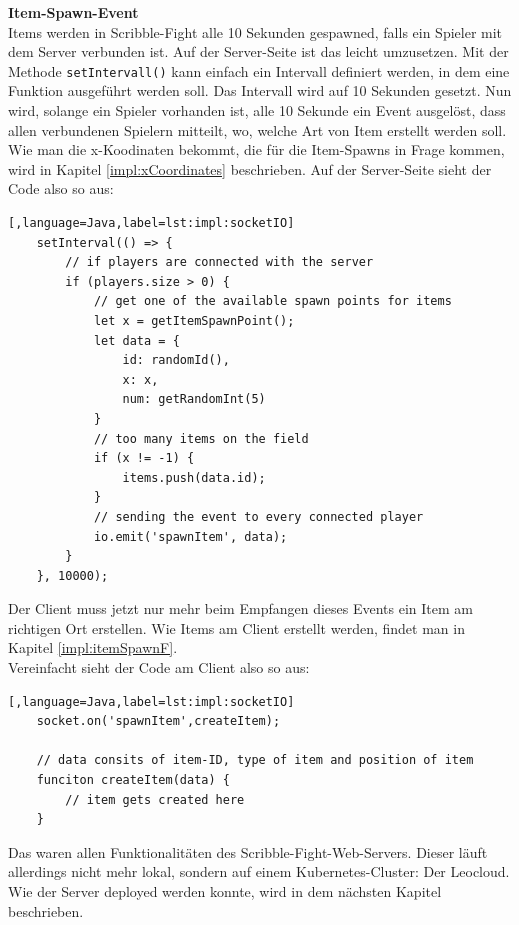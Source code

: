  \textbf{Item-Spawn-Event} \label{impl:itemSpawnB} \\
 Items werden in Scribble-Fight alle 10 Sekunden gespawned, falls ein Spieler mit dem Server verbunden ist. 
Auf der Server-Seite ist das leicht umzusetzen. Mit der Methode \texttt{setIntervall()} kann einfach ein Intervall definiert werden, in dem eine Funktion ausgeführt werden soll.
Das Intervall wird auf 10 Sekunden gesetzt. Nun wird, solange ein Spieler vorhanden ist, alle 10 Sekunde ein Event ausgelöst, dass allen verbundenen Spielern mitteilt, wo, welche Art von Item erstellt werden soll.
Wie man die x-Koodinaten bekommt, die für die Item-Spawns in Frage kommen, wird in Kapitel \ref{impl:xCoordinates} beschrieben.
Auf der Server-Seite sieht der Code also so aus:
\begin{lstlisting}[,language=Java,label=lst:impl:socketIO]
    setInterval(() => {
        // if players are connected with the server
        if (players.size > 0) {
            // get one of the available spawn points for items
            let x = getItemSpawnPoint();
            let data = {
                id: randomId(),
                x: x,
                num: getRandomInt(5)
            }
            // too many items on the field
            if (x != -1) {
                items.push(data.id);
            }
            // sending the event to every connected player
            io.emit('spawnItem', data);
        }
    }, 10000);

 \end{lstlisting}

 Der Client muss jetzt nur mehr beim Empfangen dieses Events ein Item am richtigen Ort erstellen. 
 Wie Items am Client erstellt werden, findet man in Kapitel \ref{impl:itemSpawnF}.\\
 Vereinfacht sieht der Code am Client also so aus:


\begin{lstlisting}[,language=Java,label=lst:impl:socketIO]
    socket.on('spawnItem',createItem);

    // data consits of item-ID, type of item and position of item
    funciton createItem(data) {
        // item gets created here
    }
 \end{lstlisting}

 Das waren allen Funktionalitäten des Scribble-Fight-Web-Servers. Dieser läuft allerdings nicht mehr lokal, sondern auf einem Kubernetes-Cluster: Der Leocloud. 
 Wie der Server deployed werden konnte, wird in dem nächsten Kapitel beschrieben.


